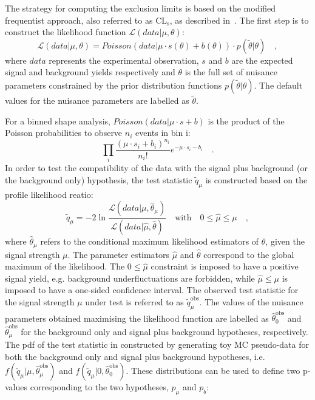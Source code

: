 The strategy for computing the exclusion limits is based on the modified frequentist approach, also referred to as $\mathrm{CL_s}$, as described in~\cite{CMS-NOTE-2011-005}. The first step is to construct the likelihood function $\mathcal{L}(data|\mu,\theta)$:
\begin{equation}
\mathcal{L}(data|\mu,\theta) = Poisson(data|\mu\cdot s(\theta) + b(\theta))\cdot p(\tilde{\theta}|\theta) \quad,
\end{equation}
where $data$ represents the experimental observation, $s$ and $b$ are the expected signal and background yields respectively and $\theta$ is the full set of nuisance parameters constrained by the prior distribution functions $p(\tilde{\theta}|\theta)$. The default values for the nuisance parameters are labelled as $\tilde{\theta}$.

For a binned shape analysis, $Poisson(data|\mu\cdot s + b)$ is the product of the Poisson probabilities to observe $n_i$ events in bin i:
\begin{equation}
\prod_i \frac{(\mu\cdot s_i + b_i)^{n_i}}{n_i !} e^{-\mu\cdot s_i - b_i} \quad.
\end{equation}
In order to test the compatibility of the data with the signal plus background (or the background only) hypothesis, the test statistic $\tilde{q}_\mu$ is constructed based on the profile likelihood reatio:
\begin{equation}
\tilde{q}_\mu = -2 \ln{\frac{\mathcal{L}(data|\mu,\hat{\theta}_\mu)}{\mathcal{L}(data|\hat{\mu},\hat{\theta})	}}  \quad \mathrm{with} \quad 0 \leq \hat{\mu} \leq \mu \quad ,
\end{equation}
where $\hat{\theta}_\mu$ refers to the conditional maximum likelihood estimators of $\theta$, given the signal strength $\mu$. The parameter estimators $\hat{\mu}$ and $\hat{\theta}$ correspond to the global maximum of the likelihood. The $0 \leq \hat{\mu}$ constraint is imposed to have a positive signal yield, e.g. background underfluctuations are forbidden, while $\hat{\mu} \leq \mu$ is imposed to have a one-sided confidence interval. The observed test statistic for the signal strength $\mu$ under test is referred to as $\tilde{q}_\mu^\mathrm{obs}$. The values of the nuisance parameters obtained maximising the likelihood function are labelled as $\hat{\theta}_0^\mathrm{obs}$ and $\hat{\theta}_\mu^\mathrm{obs}$ for the background only and signal plus background hypotheses, respectively. The pdf of the test statistic in constructed by generating toy MC pseudo-data for both the background only and signal plus background hypotheses, i.e. $f(\tilde{q}_\mu|\mu,\hat{\theta}_\mu^\mathrm{obs})$ and $f(\tilde{q}_\mu|0,\hat{\theta}_0^\mathrm{obs})$. These distributions can be used to define two p-values corresponding to the two hypotheses, $p_\mu$ and $p_b$:
